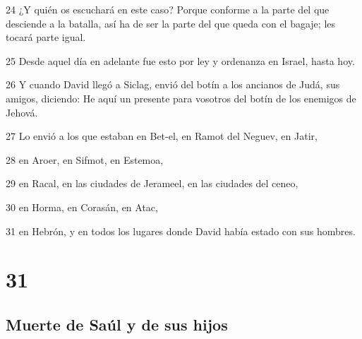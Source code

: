 \par 24 ¿Y quién os escuchará en este caso? Porque conforme a la parte del que desciende a la batalla, así ha de ser la parte del que queda con el bagaje; les tocará parte igual.
\par 25 Desde aquel día en adelante fue esto por ley y ordenanza en Israel, hasta hoy.
\par 26 Y cuando David llegó a Siclag, envió del botín a los ancianos de Judá, sus amigos, diciendo: He aquí un presente para vosotros del botín de los enemigos de Jehová.
\par 27 Lo envió a los que estaban en Bet-el, en Ramot del Neguev, en Jatir,
\par 28 en Aroer, en Sifmot, en Estemoa,
\par 29 en Racal, en las ciudades de Jerameel, en las ciudades del ceneo,
\par 30 en Horma, en Corasán, en Atac,
\par 31 en Hebrón, y en todos los lugares donde David había estado con sus hombres.

\chapter{31}

\section*{Muerte de Saúl y de sus hijos }

